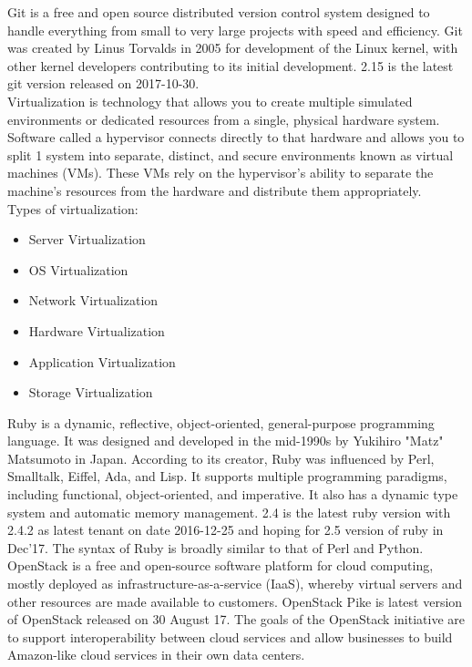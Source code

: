 \documentclass[a4paper,12pt]{report}
\begin{document}
Git is a free and open source distributed version control system designed to handle everything from small to very large projects with speed and efficiency. Git was created by Linus Torvalds in 2005 for development of the Linux kernel, with other kernel developers contributing to its initial development. 2.15 is the latest git version released on 2017-10-30.\\

Virtualization is technology that allows you to create multiple simulated environments or dedicated resources from a single, physical hardware system. Software called a hypervisor connects directly to that hardware and allows you to split 1 system into separate, distinct, and secure environments known as virtual machines (VMs). These VMs rely on the hypervisor’s ability to separate the machine’s resources from the hardware and distribute them appropriately.\\

\pagebreak
Types of virtualization:
\begin{itemize}
	\item Server Virtualization
	\item OS Virtualization
	\item Network Virtualization
	\item Hardware Virtualization
	\item Application Virtualization
	\item Storage Virtualization
\end{itemize}

Ruby is a dynamic, reflective, object-oriented, general-purpose programming language. It was designed and developed in the mid-1990s by Yukihiro "Matz" Matsumoto in Japan. According to its creator, Ruby was influenced by Perl, Smalltalk, Eiffel, Ada, and Lisp. It supports multiple programming paradigms, including functional, object-oriented, and imperative. It also has a dynamic type system and automatic memory management. 2.4 is the latest ruby version with 2.4.2 as latest tenant on date 2016-12-25 and hoping for 2.5 version of ruby in Dec'17. The syntax of Ruby is broadly similar to that of Perl and Python.\\

OpenStack is a free and open-source software platform for cloud computing, mostly deployed as infrastructure-as-a-service (IaaS), whereby virtual servers and other resources are made available to customers. OpenStack Pike is latest version of OpenStack released on 30 August 17. The goals of the OpenStack initiative are to support interoperability between cloud services and allow businesses to build Amazon-like cloud services in their own data centers.\\
\end{document}
